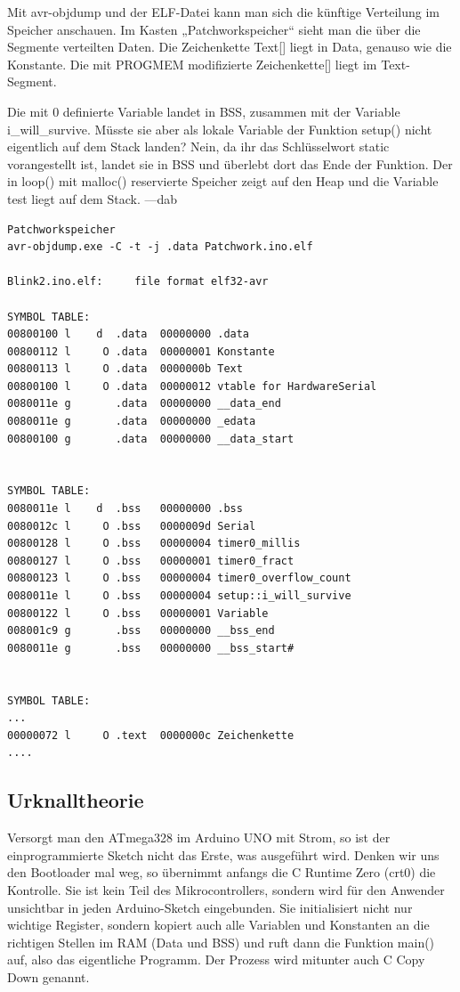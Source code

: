 Mit avr-objdump und der ELF-Datei kann man sich die künftige Verteilung im Speicher anschauen. Im Kasten „Patchworkspeicher“ sieht man die über die Segmente verteilten Daten. Die Zeichenkette Text[] liegt in Data, genauso wie die Konstante. Die mit PROGMEM modifizierte Zeichenkette[] liegt im Text-Segment.

Die mit 0 definierte Variable landet in BSS, zusammen mit der Variable i\_will\_survive. Müsste sie aber als lokale Variable der Funktion setup() nicht eigentlich auf dem Stack landen? Nein, da ihr das Schlüsselwort static vorangestellt ist, landet sie in BSS und überlebt dort das Ende der Funktion. Der in loop() mit malloc() reservierte Speicher zeigt auf den Heap und die Variable test liegt auf dem Stack. —dab

\begin{verbatim}
Patchworkspeicher
avr-objdump.exe -C -t -j .data Patchwork.ino.elf

Blink2.ino.elf:     file format elf32-avr

SYMBOL TABLE:
00800100 l    d  .data  00000000 .data
00800112 l     O .data  00000001 Konstante
00800113 l     O .data  0000000b Text
00800100 l     O .data  00000012 vtable for HardwareSerial
0080011e g       .data  00000000 __data_end
0080011e g       .data  00000000 _edata
00800100 g       .data  00000000 __data_start


SYMBOL TABLE:
0080011e l    d  .bss   00000000 .bss
0080012c l     O .bss   0000009d Serial
00800128 l     O .bss   00000004 timer0_millis
00800127 l     O .bss   00000001 timer0_fract
00800123 l     O .bss   00000004 timer0_overflow_count
0080011e l     O .bss   00000004 setup::i_will_survive
00800122 l     O .bss   00000001 Variable
008001c9 g       .bss   00000000 __bss_end
0080011e g       .bss   00000000 __bss_start#


SYMBOL TABLE:
...
00000072 l     O .text  0000000c Zeichenkette
....
\end{verbatim}

\subsection{Urknalltheorie}

Versorgt man den ATmega328 im Arduino UNO mit Strom, so ist der einprogrammierte Sketch nicht das Erste, was ausgeführt wird. Denken wir uns den Bootloader mal weg, so übernimmt anfangs die C Runtime Zero (crt0) die Kontrolle. Sie ist kein Teil des Mikrocontrollers, sondern wird für den Anwender unsichtbar in jeden Arduino-Sketch eingebunden. Sie initialisiert nicht nur wichtige Register, sondern kopiert auch alle Variablen und Konstanten an die richtigen Stellen im RAM (Data und BSS) und ruft dann die Funktion main() auf, also das eigentliche Programm. Der Prozess wird mitunter auch C Copy Down genannt.

